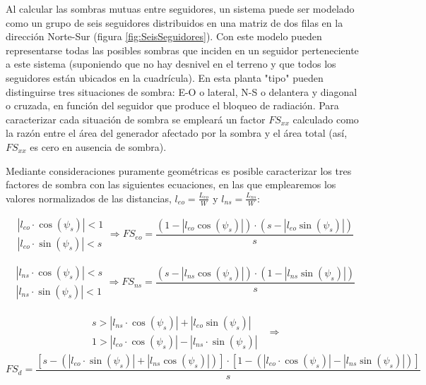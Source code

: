 Al calcular las sombras mutuas entre seguidores, un sistema puede ser
modelado como un grupo de seis seguidores distribuidos en una matriz
de dos filas en la dirección Norte-Sur (figura
\ref{fig:SeisSeguidores}).  Con este modelo pueden representarse todas
las posibles sombras que inciden en un seguidor perteneciente a este
sistema (suponiendo que no hay desnivel en el terreno y que todos los
seguidores están ubicados en la cuadrícula).  En esta planta "tipo"
pueden distinguirse tres situaciones de sombra: E-O o lateral, N-S o
delantera y diagonal o cruzada, en función del seguidor que produce el
bloqueo de radiación.  Para caracterizar cada situación de sombra se
empleará un factor $FS_{xx}$ calculado como la razón entre el área del
generador afectado por la sombra y el área total (así, $FS_{xx}$ es
cero en ausencia de sombra).  
  

Mediante consideraciones puramente geométricas es posible caracterizar 
los tres factores de sombra con las siguientes ecuaciones, en las que
emplearemos los valores normalizados de las distancias,
$l_{eo}=\frac{L_{eo}}{W}$ y $l_{ns}=\frac{L_{ns}}{W}$:

\begin{equation}
\begin{array}{c}
|l_{eo}\cdot\cos(\psi_{s})|<1\\
|l_{eo}\cdot\sin(\psi_{s})|<s\end
{array}
\Rightarrow
FS_{eo}=\frac{(1-|l_{eo}\cos(\psi_{s})|)\cdot(s-|l_{eo}\sin(\psi_{s})|)}{s}
\end{equation}


\begin{equation}
\begin{array}{c}
|l_{ns}\cdot\cos(\psi_{s})|<s\\
|l_{ns}\cdot\sin(\psi_{s})|<1
\end{array}
\Rightarrow 
FS_{ns}=\frac{(s-|l_{ns}\cos(\psi_{s})|)\cdot(1-|l_{ns}\sin(\psi_{s})|)}{s}
\end{equation}


\begin{align*}
\begin{array}{c}
s>|l_{ns}\cdot\cos(\psi_{s})|+|l_{eo}\sin(\psi_{s})|\\
1>|l_{eo}\cdot\cos(\psi_{s})|-|l_{ns}\cdot\sin(\psi_{s})|
\end{array} 
& \Rightarrow
\end{align*}
\begin{equation}
FS_{d}=\frac{\left[s-\left(|l_{eo}\cdot\sin(\psi_{s})|+|l_{ns}\cos(\psi_{s})|\right)\right]\cdot\left[1-\left(|l_{eo}\cdot\cos(\psi_{s})|-|l_{ns}\sin(\psi_{s})|\right)\right]}{s}
\end{equation}


